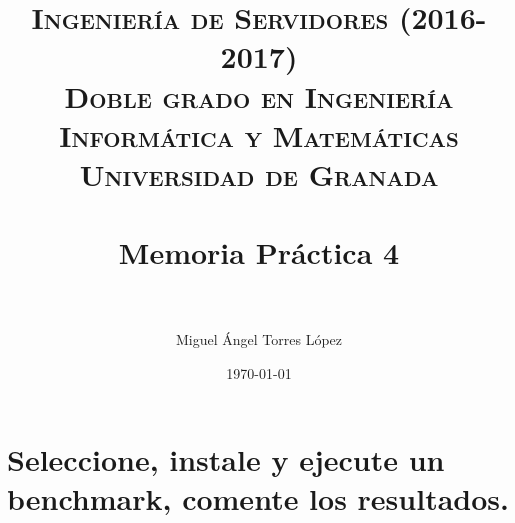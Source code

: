 
\usepackage{listings}



\title{	
\normalfont \normalsize 
\textsc{\textbf{Ingeniería de Servidores (2016-2017)} \\ Doble grado en Ingeniería Informática y Matemáticas \\ Universidad de Granada} \\ [25pt] %
\horrule{2pt} \\[0.4cm] %
\huge Memoria Práctica 4 \\ %
\horrule{2pt} \\[0.5cm] %
}

\author{Miguel Ángel Torres López} %

\date{\normalsize\today} %




\maketitle %

\newpage %

\tableofcontents %

\newpage

\listoffigures

\listoftables

\newpage


\section{Seleccione, instale y ejecute un benchmark, comente los resultados.}

